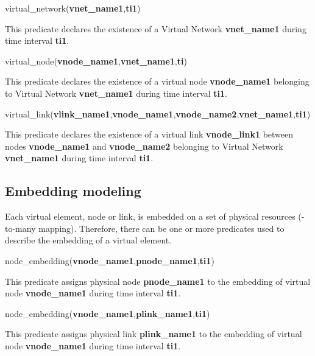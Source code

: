 \begin{myformula}
virtual\_network(\textbf{vnet\_name1},\textbf{ti1})
\end{myformula}

This predicate declares the existence of a Virtual Network \textbf{vnet\_name1} during time interval \textbf{ti1}.

\begin{myformula}
virtual\_node(\textbf{vnode\_name1},\textbf{vnet\_name1},\textbf{ti})
\end{myformula}

This predicate declares the existence of a virtual node \textbf{vnode\_name1} belonging to Virtual Network \textbf{vnet\_name1} during time interval \textbf{ti1}.

\begin{myformula}
virtual\_link(\textbf{vlink\_name1},\textbf{vnode\_name1},\textbf{vnode\_name2},\textbf{vnet\_name1},\textbf{ti1})
\end{myformula}

This predicate declares the existence of a virtual link \textbf{vnode\_link1} between nodes \textbf{vnode\_name1} and \textbf{vnode\_name2} belonging to Virtual Network \textbf{vnet\_name1} during time interval \textbf{ti1}.


\subsection{Embedding modeling}
Each virtual element, node or link, is embedded on a set of physical resources (-to-many mapping).
Therefore, there can be one or more predicates used to describe the embedding of a virtual element.

\begin{myformula}
node\_embedding(\textbf{vnode\_name1},\textbf{pnode\_name1},\textbf{ti1})
\end{myformula}

This predicate assigns physical node \textbf{pnode\_name1} to the embedding of virtual node \textbf{vnode\_name1} during time interval \textbf{ti1}.

\begin{myformula}
node\_embedding(\textbf{vnode\_name1},\textbf{plink\_name1},\textbf{ti1})
\end{myformula}

This predicate assigns physical link \textbf{plink\_name1} to the embedding of virtual node \mbox{\textbf{vnode\_name1}} during time interval \textbf{ti1}.

